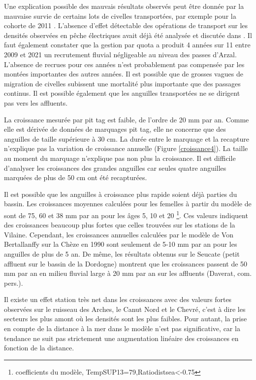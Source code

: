 \documentclass[10pt,twocolumn,titlepage,twoside]{article}\usepackage[]{graphicx}\usepackage[]{xcolor}
\begin{document}
Une explication possible des mauvais résultats observés peut être donnée par la
mauvaise survie de certains lots de civelles transportées, par exemple pour la
cohorte de 2011 \citep{mazel_v._operation_2011}. L'absence d'effet détectable des opérations
de transport sur les densités
observées en pêche électriques avait déjà été analysée et discutée dans
\citet{briand_analyse_2011}. Il faut également constater que la gestion par
quota a produit 4 années sur 11 entre 2009 et 2021 un
recrutement fluvial négligeable au niveau des passes d'Arzal. L'absence de
recrues pour ces années n'est probablement pas compensée par les montées importantes des autres années. 
Il est possible que de grosses vagues de migration de civelles subissent
une mortalité plus importante que des passages continus. Il est possible
également que les anguilles transportées ne se dirigent pas vers les affluents.


La croissance mesurée par pit tag est faible, de l'ordre de 20 mm par an. Comme
elle est dérivée de données de marquages pit tag, elle ne concerne que des
anguilles de taille supérieure à 30 cm.
La durée entre le marquage et la recapture n'explique pas la variation de
croissance annuelle (Figure \ref{croissance4}). La taille au moment du marquage
n'explique pas non plus la croissance. Il est difficile d'analyser les
croissances des grandes anguilles car seules quatre anguilles marquées de plus
de 50 cm ont été recapturées. 

Il est possible que les anguilles à croissance plus
rapide soient déjà parties du bassin. Les croissances moyennes calculées pour les femelles
à partir du modèle de \citet{daverat_one_2011} sont de 75, 60 et 38 mm par an pour les âges 5, 10 et 20 
\footnote{coefficients du modèle, TempSUP13=79,Ratiodistsea<-0.75}. 
Ces valeurs indiquent des croissances beaucoup plus fortes que celles trouvées sur les stations de 
la Vilaine. Cependant, les croissances annuelles calculées par le modèle de Von Bertallanffy sur
la Chèze en 1990 \citep{mounaix_intercalibration_1992} sont
seulement de 5-10 mm par an pour les anguilles de plus de 5 an. De même, les
résultats obtenus sur le Seucate (petit affluent sur le
bassin de la Dordogne) montrent que les croissances passent de 50 mm par an en
milieu fluvial large à 20 mm par an sur les
affluents (Daverat, com. pers.). 

Il existe un effet station très net dans les croissances avec des valeurs
fortes observées sur le ruisseau des Arches, le Canut Nord et le Chevré, c'est à
dire les secteurs les plus amont où les densités sont les plus faibles. Pour
autant, la prise en compte de la distance à la mer dans le modèle n'est pas
significative, car la tendance ne suit pas strictement une augmentation linéaire
des croissances en fonction de la distance.
\end{document}
